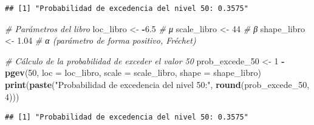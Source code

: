 \documentclass[
]{book}
\newenvironment{Shaded}{\begin{snugshade}}{\end{snugshade}}
\newcommand{\AttributeTok}[1]{\textcolor[rgb]{0.13,0.29,0.53}{#1}}
\newcommand{\CommentTok}[1]{\textcolor[rgb]{0.56,0.35,0.01}{\textit{#1}}}
\newcommand{\DecValTok}[1]{\textcolor[rgb]{0.00,0.00,0.81}{#1}}
\newcommand{\FloatTok}[1]{\textcolor[rgb]{0.00,0.00,0.81}{#1}}
\newcommand{\FunctionTok}[1]{\textcolor[rgb]{0.13,0.29,0.53}{\textbf{#1}}}
\newcommand{\NormalTok}[1]{#1}
\newcommand{\OtherTok}[1]{\textcolor[rgb]{0.56,0.35,0.01}{#1}}
\newcommand{\SpecialCharTok}[1]{\textcolor[rgb]{0.81,0.36,0.00}{\textbf{#1}}}
\newcommand{\StringTok}[1]{\textcolor[rgb]{0.31,0.60,0.02}{#1}}
\theoremstyle{definition}
\theoremstyle{definition}
\theoremstyle{definition}
\theoremstyle{definition}
\theoremstyle{remark}
\begin{document}
\begin{verbatim}
## [1] "Probabilidad de excedencia del nivel 50: 0.3575"
\end{verbatim}

\begin{Shaded}
\begin{Highlighting}[]
\CommentTok{\# Parámetros del libro}
\NormalTok{loc\_libro }\OtherTok{\textless{}{-}} \SpecialCharTok{{-}}\FloatTok{6.5}    \CommentTok{\# μ}
\NormalTok{scale\_libro }\OtherTok{\textless{}{-}} \DecValTok{44}     \CommentTok{\# β}
\NormalTok{shape\_libro }\OtherTok{\textless{}{-}} \FloatTok{1.04}   \CommentTok{\# α (parámetro de forma positivo, Fréchet)}

\CommentTok{\# Cálculo de la probabilidad de exceder el valor 50}
\NormalTok{prob\_excede\_50 }\OtherTok{\textless{}{-}} \DecValTok{1} \SpecialCharTok{{-}} \FunctionTok{pgev}\NormalTok{(}\DecValTok{50}\NormalTok{, }\AttributeTok{loc =}\NormalTok{ loc\_libro, }\AttributeTok{scale =}\NormalTok{ scale\_libro, }\AttributeTok{shape =}\NormalTok{ shape\_libro)}
\FunctionTok{print}\NormalTok{(}\FunctionTok{paste}\NormalTok{(}\StringTok{"Probabilidad de excedencia del nivel 50:"}\NormalTok{, }\FunctionTok{round}\NormalTok{(prob\_excede\_50, }\DecValTok{4}\NormalTok{)))}
\end{Highlighting}
\end{Shaded}

\begin{verbatim}
## [1] "Probabilidad de excedencia del nivel 50: 0.3575"
\end{verbatim}
\end{document}
